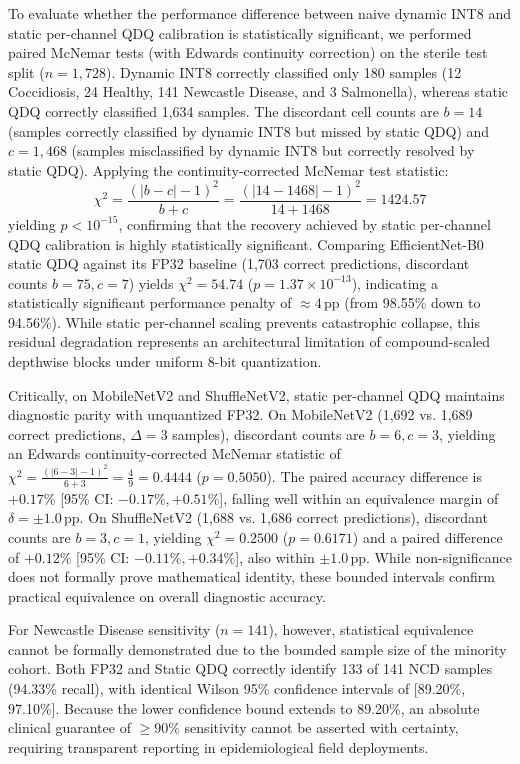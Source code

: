 \documentclass{jcse}
\begin{document}
To evaluate whether the performance difference between naive dynamic INT8 and static per-channel QDQ calibration is statistically significant, we performed paired McNemar tests (with Edwards continuity correction) on the sterile test split ($n=1,728$). Dynamic INT8 correctly classified only 180 samples (12 Coccidiosis, 24 Healthy, 141 Newcastle Disease, and 3 Salmonella), whereas static QDQ correctly classified 1,634 samples. The discordant cell counts are $b = 14$ (samples correctly classified by dynamic INT8 but missed by static QDQ) and $c = 1,468$ (samples misclassified by dynamic INT8 but correctly resolved by static QDQ). Applying the continuity-corrected McNemar test statistic:
\begin{equation}
\chi^2 = \frac{(|b - c| - 1)^2}{b + c} = \frac{(|14 - 1468| - 1)^2}{14 + 1468} = 1424.57
\end{equation}
yielding $p < 10^{-15}$, confirming that the recovery achieved by static per-channel QDQ calibration is highly statistically significant. Comparing EfficientNet-B0 static QDQ against its FP32 baseline (1,703 correct predictions, discordant counts $b = 75, c = 7$) yields $\chi^2 = 54.74$ ($p = 1.37 \times 10^{-13}$), indicating a statistically significant performance penalty of $\approx 4$\,pp (from 98.55\% down to 94.56\%). While static per-channel scaling prevents catastrophic collapse, this residual degradation represents an architectural limitation of compound-scaled depthwise blocks under uniform 8-bit quantization.

Critically, on MobileNetV2 and ShuffleNetV2, static per-channel QDQ maintains diagnostic parity with unquantized FP32. On MobileNetV2 (1,692 vs. 1,689 correct predictions, $\Delta = 3$ samples), discordant counts are $b=6, c=3$, yielding an Edwards continuity-corrected McNemar statistic of $\chi^2 = \frac{(|6-3|-1)^2}{6+3} = \frac{4}{9} = 0.4444$ ($p = 0.5050$). The paired accuracy difference is $+0.17\%$ [95\% CI: $-0.17\%, +0.51\%$], falling well within an equivalence margin of $\delta = \pm 1.0$\,pp. On ShuffleNetV2 (1,688 vs. 1,686 correct predictions), discordant counts are $b=3, c=1$, yielding $\chi^2 = 0.2500$ ($p = 0.6171$) and a paired difference of $+0.12\%$ [95\% CI: $-0.11\%, +0.34\%$], also within $\pm 1.0$\,pp. While non-significance does not formally prove mathematical identity, these bounded intervals confirm practical equivalence on overall diagnostic accuracy.

For Newcastle Disease sensitivity ($n=141$), however, statistical equivalence cannot be formally demonstrated due to the bounded sample size of the minority cohort. Both FP32 and Static QDQ correctly identify 133 of 141 NCD samples (94.33\% recall), with identical Wilson 95\% confidence intervals of [89.20\%, 97.10\%]. Because the lower confidence bound extends to 89.20\%, an absolute clinical guarantee of $\ge 90\%$ sensitivity cannot be asserted with certainty, requiring transparent reporting in epidemiological field deployments.
\end{document}
